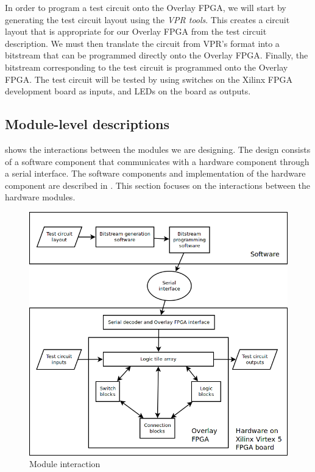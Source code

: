 In order to program a test circuit onto the Overlay FPGA, we will start by generating the test circuit layout using the \emph{VPR tools}.
This creates a circuit layout that is appropriate for our Overlay FPGA from the test circuit description.
We must then translate the circuit from VPR's format into a bitstream that can be programmed directly onto the Overlay FPGA.
Finally, the bitstream corresponding to the test circuit is programmed onto the Overlay FPGA.
The test circuit will be tested by using switches on the Xilinx FPGA development board as inputs, and LEDs on the board as outputs.



\subsection{Module-level descriptions} %

 shows the interactions between the modules we are designing.
The design consists of a software component that communicates with a hardware component through a serial interface.
The software components and implementation of the hardware component are described in .
This section focuses on the interactions between the hardware modules.

\begin{figure}[!h]
	\centering
	\includegraphics[scale=0.5]{modules.png}
	\caption{Module interaction}
	\label{module-diagram}
\end{figure}

